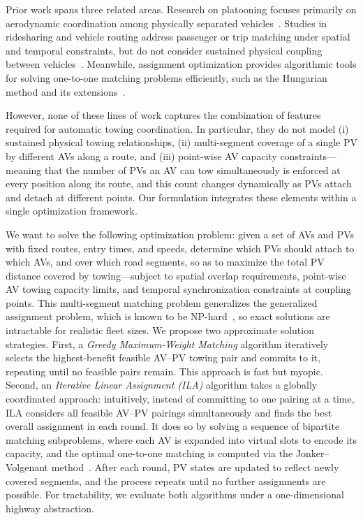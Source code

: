 \documentclass[conference]{IEEEtran}
\begin{document}
Prior work spans three related areas. Research on platooning focuses primarily on aerodynamic coordination among physically separated vehicles~\cite{tsugawa2016review,bergenhem2012overview}. Studies in ridesharing and vehicle routing address passenger or trip matching under spatial and temporal constraints, but do not consider sustained physical coupling between vehicles~\cite{furuhata2013ridesharing,agatz2012optimization,cordeau2007dial}. Meanwhile, assignment optimization provides algorithmic tools for solving one-to-one matching problems efficiently, such as the Hungarian method and its extensions~\cite{kuhn1955hungarian,munkres1957algorithms}.

However, none of these lines of work captures the combination of features required for automatic towing coordination. In particular, they do not model (i) sustained physical towing relationships, (ii) multi-segment coverage of a single PV by different AVs along a route, and (iii) point-wise AV capacity constraints---meaning that the number of PVs an AV can tow simultaneously is enforced at every position along its route, and this count changes dynamically as PVs attach and detach at different points. Our formulation integrates these elements within a single optimization framework.

We want to solve the following optimization problem: given a set of AVs and PVs with fixed routes, entry times, and speeds, determine which PVs should attach to which AVs, and over which road segments, so as to maximize the total PV distance covered by towing---subject to spatial overlap requirements, point-wise AV towing capacity limits, and temporal synchronization constraints at coupling points. This multi-segment matching problem generalizes the generalized assignment problem, which is known to be NP-hard~\cite{cattrysse1992survey}, so exact solutions are intractable for realistic fleet sizes. We propose two approximate solution strategies. First, a \textit{Greedy Maximum-Weight Matching} algorithm iteratively selects the highest-benefit feasible AV--PV towing pair and commits to it, repeating until no feasible pairs remain. This approach is fast but myopic. Second, an \textit{Iterative Linear Assignment (ILA)} algorithm takes a globally coordinated approach: intuitively, instead of committing to one pairing at a time, ILA considers all feasible AV--PV pairings simultaneously and finds the best overall assignment in each round. It does so by solving a sequence of bipartite matching subproblems, where each AV is expanded into virtual slots to encode its capacity, and the optimal one-to-one matching is computed via the Jonker--Volgenant method~\cite{scipy2020}. After each round, PV states are updated to reflect newly covered segments, and the process repeats until no further assignments are possible. For tractability, we evaluate both algorithms under a one-dimensional highway abstraction.
\end{document}
